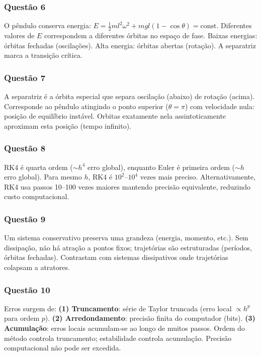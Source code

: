 \documentclass[12pt,a4paper]{article}
\begin{document}
\subsubsection{Questão 6}
O pêndulo conserva energia: $E = \frac{1}{2}ml^2\omega^2 + mgl(1-\cos\theta) = \text{const}$. Diferentes valores de $E$ correspondem a diferentes órbitas no espaço de fase. Baixas energias: órbitas fechadas (oscilações). Alta energia: órbitas abertas (rotação). A separatriz marca a transição crítica.

\subsubsection{Questão 7}
A separatriz é a órbita especial que separa oscilação (abaixo) de rotação (acima). Corresponde ao pêndulo atingindo o ponto superior ($\theta = \pi$) com velocidade nula: posição de equilíbrio instável. Orbitas exatamente nela assintoticamente aproximam esta posição (tempo infinito).

\subsubsection{Questão 8}
RK4 é quarta ordem ($\sim h^4$ erro global), enquanto Euler é primeira ordem ($\sim h$ erro global). Para mesmo $h$, RK4 é $10^2$--$10^4$ vezes mais preciso. Alternativamente, RK4 usa passos 10--100 vezes maiores mantendo precisão equivalente, reduzindo custo computacional.

\subsubsection{Questão 9}
Um sistema conservativo preserva uma grandeza (energia, momento, etc.). Sem dissipação, não há atração a pontos fixos; trajetórias são estruturadas (períodos, órbitas fechadas). Contrastam com sistemas dissipativos onde trajetórias colapsam a atratores.

\subsubsection{Questão 10}
Erros surgem de: \textbf{(1) Truncamento}: série de Taylor truncada (erro local $\propto h^p$ para ordem $p$). \textbf{(2) Arredondamento}: precisão finita do computador (bits). \textbf{(3) Acumulação}: erros locais acumulam-se ao longo de muitos passos. Ordem do método controla truncamento; estabilidade controla acumulação. Precisão computacional não pode ser excedida.
\end{document}
